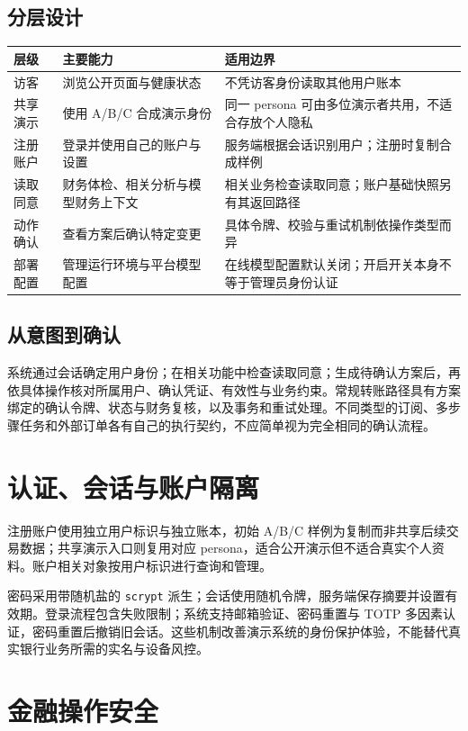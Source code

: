 \documentclass[journal,wp,nowatermark,nobib,clean]{paper}
\newcommand{\code}[1]{{\small\nolinkurl{#1}}}
\begin{document}
\subsection{分层设计}
\begin{longtable}{L{.19\textwidth}L{.34\textwidth}L{.34\textwidth}}
\toprule 层级 & 主要能力 & 适用边界 \\\midrule\endhead
访客 & 浏览公开页面与健康状态 & 不凭访客身份读取其他用户账本 \\
共享演示 & 使用 A/B/C 合成演示身份 & 同一 persona 可由多位演示者共用，不适合存放个人隐私 \\
注册账户 & 登录并使用自己的账户与设置 & 服务端根据会话识别用户；注册时复制合成样例 \\
读取同意 & 财务体检、相关分析与模型财务上下文 & 相关业务检查读取同意；账户基础快照另有其返回路径 \\
动作确认 & 查看方案后确认特定变更 & 具体令牌、校验与重试机制依操作类型而异 \\
部署配置 & 管理运行环境与平台模型配置 & 在线模型配置默认关闭；开启开关本身不等于管理员身份认证 \\\bottomrule
\end{longtable}

\subsection{从意图到确认}
系统通过会话确定用户身份；在相关功能中检查读取同意；生成待确认方案后，再依具体操作核对所属用户、确认凭证、有效性与业务约束。常规转账路径具有方案绑定的确认令牌、状态与财务复核，以及事务和重试处理。不同类型的订阅、多步骤任务和外部订单各有自己的执行契约，不应简单视为完全相同的确认流程。

\section{认证、会话与账户隔离}
注册账户使用独立用户标识与独立账本，初始 A/B/C 样例为复制而非共享后续交易数据；共享演示入口则复用对应 persona，适合公开演示但不适合真实个人资料。账户相关对象按用户标识进行查询和管理。

密码采用带随机盐的 \code{scrypt} 派生；会话使用随机令牌，服务端保存摘要并设置有效期。登录流程包含失败限制；系统支持邮箱验证、密码重置与 TOTP 多因素认证，密码重置后撤销旧会话。这些机制改善演示系统的身份保护体验，不能替代真实银行业务所需的实名与设备风控。

\section{金融操作安全}
\end{document}
